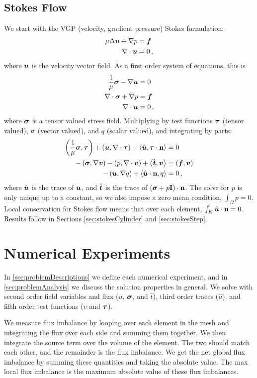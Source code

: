 \documentclass[Proposal.tex]{subfiles}
\begin{document}
\subsection{Stokes Flow}
We start with the VGP (velocity, gradient pressure) Stokes formulation:
\begin{align*}
   \mu\Delta \boldsymbol u+\nabla p&=\boldsymbol f\\
   \nabla\cdot\boldsymbol u&=0\,,
\end{align*}
where $\boldsymbol u$ is the velocity vector field.
As a first order system of equations, this is
\begin{align*}
   \frac{1}{\mu}\boldsymbol\sigma-\nabla\boldsymbol u&=0\\
   \nabla\cdot\boldsymbol\sigma+\nabla p&=\boldsymbol f\\
   \nabla\cdot\boldsymbol u&=0\,,
\end{align*}
where $\boldsymbol\sigma$ is a tensor valued stress field.
Multiplying by test functions $\boldsymbol\tau$ (tensor valued), $\boldsymbol v$ (vector
valued), and $q$ (scalar valued), and integrating by parts:
\begin{align*}
   \left( \frac{1}{\mu}\boldsymbol\sigma,\boldsymbol\tau \right)+\left( \boldsymbol u,\nabla\cdot\boldsymbol\tau \right)-\left\langle \hat
   {\boldsymbol u},\boldsymbol\tau\cdot\mathbf{n} \right\rangle&=0\\
   -\left( \boldsymbol\sigma,\nabla\boldsymbol v \right)-\left( p,\nabla\cdot\boldsymbol v \right)+\left\langle \hat {\boldsymbol t},\boldsymbol v \right\rangle&=\left( \boldsymbol f,\boldsymbol v \right)\\
   -\left( \boldsymbol u,\nabla q \right)+\left\langle \hat{\boldsymbol u}\cdot\mathbf{n},q \right\rangle&=0\,,
\end{align*}
where $\hat{\boldsymbol u}$ is the trace of $\boldsymbol u$, and $\hat{\boldsymbol t}$ is the trace of
$\left( \boldsymbol\sigma+p\mathbf{I} \right)\cdot\mathbf{n}$. The solve for $p$ is only unique
up to a constant, so we also impose a zero mean condition, $\int_\Omega p=0$.
Local conservation for Stokes flow means that over each element,
$\int_K\hat{\boldsymbol u}\cdot\mathbf{n}=0$. Results follow in Sections
\ref{sec:stokesCylinder} and \ref{sec:stokesStep}.

\section{Numerical Experiments}
In \ref{sec:problemDescriptions} we define each numerical experiment, and in
\ref{sec:problemAnalysis} we discuss the solution properties in general. We
solve with second order field variables and flux ($u$, $\boldsymbol\sigma$, and $\hat
t$), third order traces ($\hat u$), and fifth order test functions ($v$ and
$\boldsymbol\tau$).

We measure flux imbalance by looping over each element in the mesh and
integrating the flux over each side and summing them together. We then
integrate the source term over the volume of the element. The two should match
each other, and the remainder is the flux imbalance. We get the net global
flux imbalance by summing these quantities and taking the absolute value. The
max local flux imbalance is the maximum absolute value of these flux
imbalances.
\end{document}

